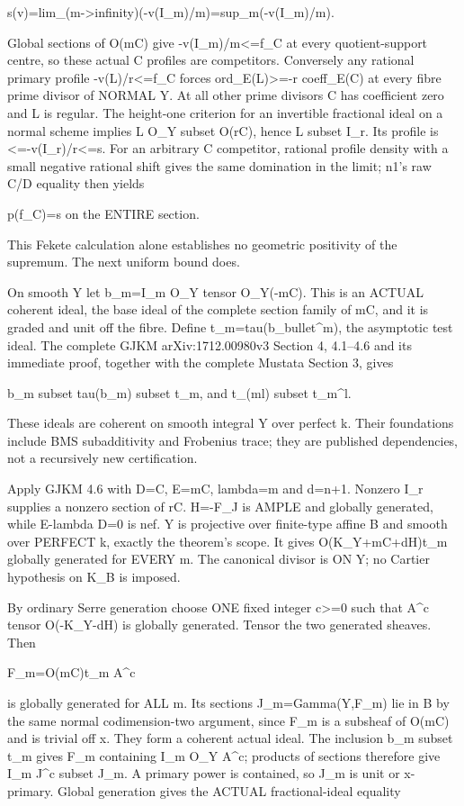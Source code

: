 \documentclass[11pt]{article}
\begin{document}
s(v)=lim\_(m->infinity)(-v(I\_m)/m)=sup\_m(-v(I\_m)/m).

Global sections of O(mC) give -v(I\_m)/m<=f\_C at every quotient-support centre, so these actual C profiles are competitors. Conversely any rational primary profile -v(L)/r<=f\_C forces ord\_E(L)>=-r coeff\_E(C) at every fibre prime divisor of NORMAL Y. At all other prime divisors C has coefficient zero and L is regular. The height-one criterion for an invertible fractional ideal on a normal scheme implies L O\_Y subset O(rC), hence L subset I\_r. Its profile is <=-v(I\_r)/r<=s. For an arbitrary C competitor, rational profile density with a small negative rational shift gives the same domination in the limit; n1's raw C/D equality then yields

p(f\_C)=s on the ENTIRE section.

This Fekete calculation alone establishes no geometric positivity of the supremum. The next uniform bound does.

On smooth Y let b\_m=I\_m O\_Y tensor O\_Y(-mC). This is an ACTUAL coherent ideal, the base ideal of the complete section family of mC, and it is graded and unit off the fibre. Define t\_m=tau(b\_bullet\textasciicircum{}m), the asymptotic test ideal. The complete GJKM arXiv:1712.00980v3 Section 4, 4.1--4.6 and its immediate proof, together with the complete Mustata Section 3, gives

b\_m subset tau(b\_m) subset t\_m, and t\_(ml) subset t\_m\textasciicircum{}l.

These ideals are coherent on smooth integral Y over perfect k. Their foundations include BMS subadditivity and Frobenius trace; they are published dependencies, not a recursively new certification.

Apply GJKM 4.6 with D=C, E=mC, lambda=m and d=n+1. Nonzero I\_r supplies a nonzero section of rC. H=-F\_J is AMPLE and globally generated, while E-lambda D=0 is nef. Y is projective over finite-type affine B and smooth over PERFECT k, exactly the theorem's scope. It gives O(K\_Y+mC+dH)t\_m globally generated for EVERY m. The canonical divisor is ON Y; no Cartier hypothesis on K\_B is imposed.

By ordinary Serre generation choose ONE fixed integer c>=0 such that A\textasciicircum{}c tensor O(-K\_Y-dH) is globally generated. Tensor the two generated sheaves. Then

F\_m=O(mC)t\_m A\textasciicircum{}c

is globally generated for ALL m. Its sections J\_m=Gamma(Y,F\_m) lie in B by the same normal codimension-two argument, since F\_m is a subsheaf of O(mC) and is trivial off x. They form a coherent actual ideal. The inclusion b\_m subset t\_m gives F\_m containing I\_m O\_Y A\textasciicircum{}c; products of sections therefore give I\_m J\textasciicircum{}c subset J\_m. A primary power is contained, so J\_m is unit or x-primary. Global generation gives the ACTUAL fractional-ideal equality
\end{document}
